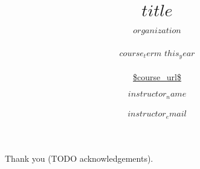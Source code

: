
\newcommand{\courseurl}{\url{$course_url$}}
\newcommand{\thisyear}{$this_year$}

\newcommand{\mydetails}{%
    $instructor_name$ \\\\
   $instructor_email$  \\\\[1em]
   $organization$  \\\\
}



\title{ $title$ }
\subtitle{ $organization$ \\\\%
$course_term$ \thisyear\\\\%
\courseurl}

\author{ $instructor_name$ \\\\ $instructor_email$ }
\date{}
\maketitle
\tableofcontents

\vspace{10pt}\noindent Thank you (TODO acknowledgements).

\def\sectionautorefname{Section}%
\def\subsectionautorefname{Section}%
\def\subsubsectionautorefname{Section}%

\nocite{*}

